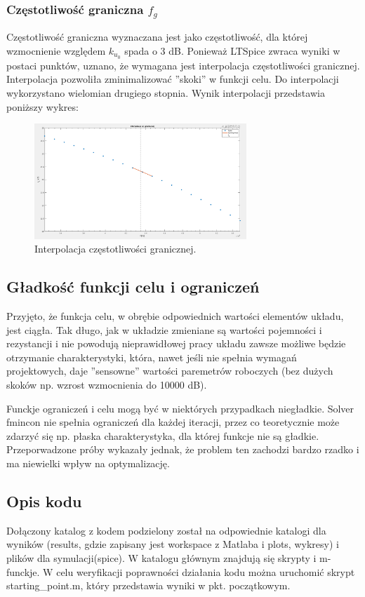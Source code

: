 \documentclass{article}
\begin{document}
\subsubsection*{Częstotliwość graniczna $f_g$}
Częstotliwość graniczna wyznaczana jest jako częstotliwość, dla której wzmocnienie względem $k_{u{_0}}$ spada o 3 dB.
Ponieważ LTSpice zwraca wyniki w postaci punktów, uznano, że wymagana jest interpolacja częstotliwości granicznej. Interpolacja pozwoliła zminimalizować ''skoki'' w funkcji celu. Do interpolacji wykorzystano wielomian drugiego stopnia. Wynik interpolacji przedstawia poniższy wykres:
\begin{figure}[h]
	\includegraphics[width=8cm]{graphics/fg_interp.png}
	\centering
	\caption{Interpolacja częstotliwości granicznej.}
\end{figure}




\subsection{Gładkość funkcji celu i ograniczeń}
Przyjęto, że funkcja celu, w obrębie odpowiednich wartości elementów układu, jest ciągła. Tak długo, jak w układzie zmieniane są wartości pojemności i rezystancji i
nie powodują nieprawidłowej pracy układu zawsze możliwe będzie otrzymanie charakterystyki, która, nawet jeśli nie spełnia wymagań projektowych, daje ''sensowne'' wartości paremetrów roboczych (bez dużych skoków
np. wzrost wzmocnienia do 10000 dB).

Funckje ograniczeń i celu mogą być w niektórych przypadkach niegładkie. Solver fmincon nie spełnia ograniczeń dla każdej iteracji, przez co teoretycznie może zdarzyć się np. płaska charakterystyka, 
dla której funkcje nie są gładkie. Przeporwadzone próby wykazały jednak, że problem ten zachodzi bardzo rzadko i ma niewielki wpływ na optymalizację.
\subsection{Opis kodu}
Dołączony katalog z kodem podzielony został na odpowiednie katalogi dla wyników (results, gdzie zapisany jest workspace z Matlaba i plots, wykresy) i plików dla symulacji(spice).
W katalogu głównym znajdują się skrypty i m-funckje. W celu weryfikacji poprawności działania kodu można uruchomić skrypt starting\_point.m, który przedstawia wyniki w pkt. początkowym.
\end{document}
